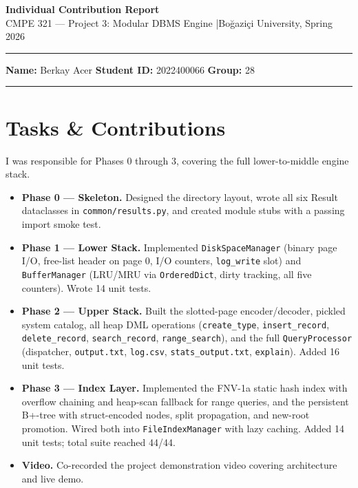 \documentclass[12pt]{article}
\begin{document}
\begin{center}
    {\large\bfseries Individual Contribution Report}\\[4pt]
    CMPE 321 — Project 3: Modular DBMS Engine \quad|\quad Boğaziçi University, Spring 2026
\end{center}
\hrule\vspace{4pt}
\noindent\textbf{Name:} Berkay Acer \hfill \textbf{Student ID:} 2022400066 \hfill \textbf{Group:} 28
\vspace{4pt}\hrule

\section{Tasks \& Contributions}

I was responsible for Phases 0 through 3, covering the full lower-to-middle engine stack.

\begin{itemize}[leftmargin=*, itemsep=1pt, topsep=2pt]
    \item \textbf{Phase 0 — Skeleton.} Designed the directory layout, wrote all six Result dataclasses in \texttt{common/results.py}, and created module stubs with a passing import smoke test.

    \item \textbf{Phase 1 — Lower Stack.} Implemented \texttt{DiskSpaceManager} (binary page I/O, free-list header on page 0, I/O counters, \texttt{log\_write} slot) and \texttt{BufferManager} (LRU/MRU via \texttt{OrderedDict}, dirty tracking, all five counters). Wrote 14 unit tests.

    \item \textbf{Phase 2 — Upper Stack.} Built the slotted-page encoder/decoder, pickled system catalog, all heap DML operations (\texttt{create\_type}, \texttt{insert\_record}, \texttt{delete\_record}, \texttt{search\_record}, \texttt{range\_search}), and the full \texttt{QueryProcessor} (dispatcher, \texttt{output.txt}, \texttt{log.csv}, \texttt{stats\_output.txt}, \texttt{explain}). Added 16 unit tests.

    \item \textbf{Phase 3 — Index Layer.} Implemented the FNV-1a static hash index with overflow chaining and heap-scan fallback for range queries, and the persistent B+-tree with struct-encoded nodes, split propagation, and new-root promotion. Wired both into \texttt{FileIndexManager} with lazy caching. Added 14 unit tests; total suite reached 44/44.

    \item \textbf{Video.} Co-recorded the project demonstration video covering architecture and live demo.
\end{itemize}
\end{document}
